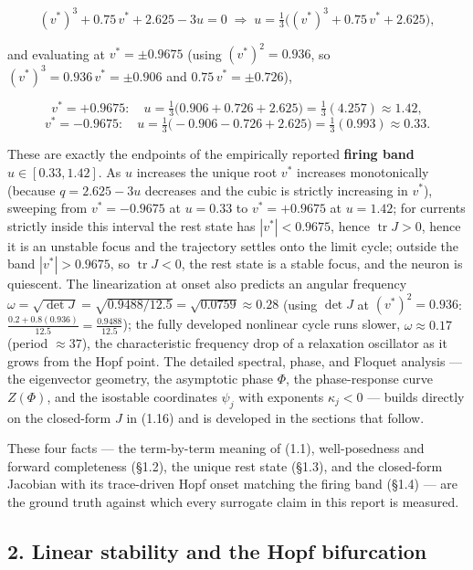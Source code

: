 \documentclass[
  11pt,
]{article}
\providecommand{\lt}{<}
\providecommand{\gt}{>}
\begin{document}
\[
(v^\ast)^3+0.75\,v^\ast+2.625-3u=0
\;\Longrightarrow\;
u=\tfrac13\bigl((v^\ast)^3+0.75\,v^\ast+2.625\bigr),
\]

and evaluating at \(v^\ast=\pm0.9675\) (using \((v^\ast)^2=0.936\), so
\((v^\ast)^3=0.936\,v^\ast=\pm0.906\) and \(0.75\,v^\ast=\pm0.726\)),

\[
v^\ast=+0.9675:\quad u=\tfrac13\bigl(0.906+0.726+2.625\bigr)=\tfrac13(4.257)\approx 1.42,
\] \[
v^\ast=-0.9675:\quad u=\tfrac13\bigl(-0.906-0.726+2.625\bigr)=\tfrac13(0.993)\approx 0.33.
\tag{1.20}
\]

These are exactly the endpoints of the empirically reported
\textbf{firing band \(u\in[0.33,1.42]\)}. As \(u\) increases the unique
root \(v^\ast\) increases monotonically (because \(q=2.625-3u\)
decreases and the cubic is strictly increasing in \(v^\ast\)), sweeping
from \(v^\ast=-0.9675\) at \(u=0.33\) to \(v^\ast=+0.9675\) at
\(u=1.42\); for currents strictly inside this interval the rest state
has \(|v^\ast|\lt 0.9675\), hence \(\operatorname{tr}J\gt 0\), hence it
is an unstable focus and the trajectory settles onto the limit cycle;
outside the band \(|v^\ast|\gt 0.9675\), so \(\operatorname{tr}J\lt 0\),
the rest state is a stable focus, and the neuron is quiescent. The
linearization at onset also predicts an angular frequency
\(\omega=\sqrt{\det J}=\sqrt{0.9488/12.5}=\sqrt{0.0759}\approx 0.28\)
(using \(\det J\) at \((v^\ast)^2=0.936\):
\(\tfrac{0.2+0.8(0.936)}{12.5}=\tfrac{0.9488}{12.5}\)); the fully
developed nonlinear cycle runs slower, \(\omega\approx 0.17\) (period
\(\approx 37\)), the characteristic frequency drop of a relaxation
oscillator as it grows from the Hopf point. The detailed spectral,
phase, and Floquet analysis --- the eigenvector geometry, the asymptotic
phase \(\Phi\), the phase-response curve \(Z(\Phi)\), and the isostable
coordinates \(\psi_j\) with exponents \(\kappa_j\lt 0\) --- builds
directly on the closed-form \(J\) in (1.16) and is developed in the
sections that follow.

These four facts --- the term-by-term meaning of (1.1), well-posedness
and forward completeness (§1.2), the unique rest state (§1.3), and the
closed-form Jacobian with its trace-driven Hopf onset matching the
firing band (§1.4) --- are the ground truth against which every
surrogate claim in this report is measured.

\subsection{2. Linear stability and the Hopf
bifurcation}\label{linear-stability-and-the-hopf-bifurcation}
\end{document}
